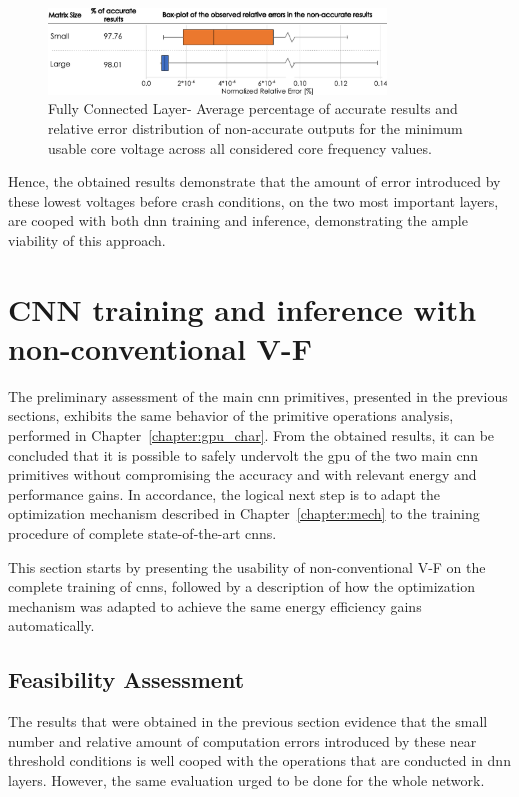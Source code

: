 \begin{figure}[htbp]
    \centering
        \includegraphics[width=0.8\textwidth]{Figures/Application To Deep Learning/MatrixMul_Error_Distribution.pdf}
        \caption{Fully Connected Layer- Average percentage of accurate results and relative error distribution of non-accurate outputs for the minimum usable core voltage across all considered core frequency values.}
    \label{fig:MatrixMult_errors}
\end{figure}

Hence, the obtained results demonstrate that the amount of error introduced by these lowest voltages before crash conditions, on the two most important layers, are cooped with both \acrshort{dnn} training and inference, demonstrating the ample viability of this approach.


\section{CNN training and inference with non-conventional V-F}
\label{section:enhanced}

The preliminary assessment of the main \acrshort{cnn} primitives, presented in the previous sections, exhibits the same behavior of the primitive operations analysis, performed in Chapter~\ref{chapter:gpu_char}. From the obtained results, it can be concluded that it is possible to safely undervolt the \acrshort{gpu} of the two main \acrshort{cnn} primitives without compromising the accuracy and with relevant energy and performance gains. In accordance, the logical next step is to adapt the optimization mechanism described in Chapter~\ref{chapter:mech} to the training procedure of complete state-of-the-art \acrshort{cnn}s.


This section starts by presenting the usability of non-conventional V-F on the complete training of \acrshort{cnn}s, followed by a description of how the optimization mechanism was adapted to achieve the same energy efficiency gains automatically.

\subsection{Feasibility Assessment}
\label{sec:fea_ass}
The results that were obtained in the previous section evidence that the small number and relative amount of computation errors introduced by these near threshold conditions is well cooped with the operations that are conducted in \acrshort{dnn} layers. However, the same evaluation urged to be done for the whole network.


